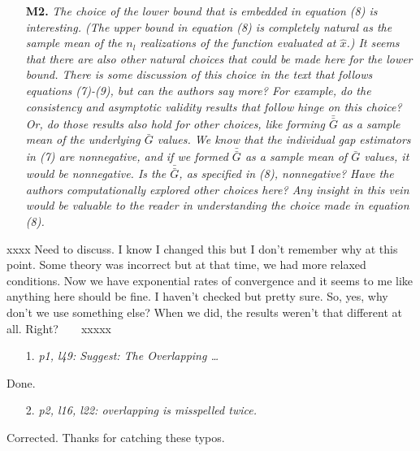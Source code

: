 \documentclass[11pt,notitlepage,onecolumn]{article}
\newcommand{\noi}{\noindent}
\begin{document}
\begin{itemize}
\item[\textbf{M2.}] \textit{The choice of the lower bound that is embedded in equation (8) is interesting. 
(The upper bound in equation (8) is completely natural as the sample mean of the $n_l$ realizations of the function evaluated at $\hat{x}$.) 
It seems that there are also other natural choices that could be made here for the lower bound. 
There is some discussion of this choice in the text that follows equations (7)-(9), but can the authors say more? For example, do the consistency and asymptotic validity results that follow hinge on this choice? Or, do those results also hold for other choices, like forming $\bar\bar{G}$ as a sample
mean of the underlying $\bar{G}$ values. 
We know that the individual gap estimators in (7) are nonnegative, and if we formed $\bar\bar{G}$ as a sample mean of $\bar{G}$ values, it would be nonnegative. 
Is the $\bar\bar{G}$, as specified in (8), nonnegative? 
Have the authors computationally explored other choices here? 
Any insight in this vein would be valuable to the reader in understanding the choice made in equation (8).}
\end{itemize}

\noi
xxxx  Need to discuss. 
I know I changed this but I don't remember why at this point. 
Some theory was incorrect but at that time, we had more relaxed conditions. 
Now we have exponential rates of convergence and it seems to me like anything here should be fine. 
I haven't checked but pretty sure. 
So, yes, why don't we use something else? 
When we did, the results weren't that different at all. 
Right?\ \ \ \ 
xxxxx
\medskip 

\bigskip 

\noi {\large \bf Minor comments:}

\bigskip



\begin{itemize}
\item[1.] \textit{p1, l49: Suggest: The Overlapping \ldots }
\end{itemize}

\noindent 
Done. 
\medskip 

\begin{itemize}
\item[2.] \textit{p2, l16, l22: overlapping is misspelled twice.}
\end{itemize}

\noindent 
Corrected. Thanks for catching these typos.
\medskip 
\end{document}
